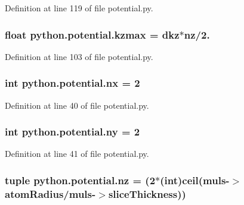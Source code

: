Definition at line 119 of file potential.\-py.

\hypertarget{namespacepython_1_1potential_a3a69e39363e420f0cb60f983db42644c}{
\subsubsection[{kzmax}]{\setlength{\rightskip}{0pt plus 5cm}float python.\-potential.\-kzmax = {\bf dkz}$\ast${\bf nz}/2.}}\label{namespacepython_1_1potential_a3a69e39363e420f0cb60f983db42644c}


Definition at line 103 of file potential.\-py.

\hypertarget{namespacepython_1_1potential_a45ef3ba885a8655a58532ce88f7a85b0}{
\subsubsection[{nx}]{\setlength{\rightskip}{0pt plus 5cm}int python.\-potential.\-nx = 2}}\label{namespacepython_1_1potential_a45ef3ba885a8655a58532ce88f7a85b0}


Definition at line 40 of file potential.\-py.

\hypertarget{namespacepython_1_1potential_a35c4557193f9702081df5ac284fbcf3b}{
\subsubsection[{ny}]{\setlength{\rightskip}{0pt plus 5cm}int python.\-potential.\-ny = 2}}\label{namespacepython_1_1potential_a35c4557193f9702081df5ac284fbcf3b}


Definition at line 41 of file potential.\-py.

\hypertarget{namespacepython_1_1potential_aff640d78c41598ce018eaf70cc0af2e0}{
\subsubsection[{nz}]{\setlength{\rightskip}{0pt plus 5cm}tuple python.\-potential.\-nz = (2$\ast$(int)ceil(muls-\/$>${\bf atom\-Radius}/muls-\/$>$slice\-Thickness))}}\label{namespacepython_1_1potential_aff640d78c41598ce018eaf70cc0af2e0}


